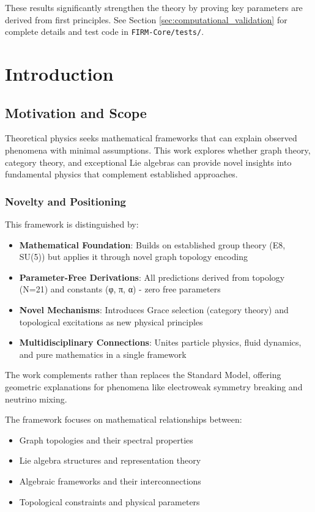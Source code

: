 \documentclass[12pt,a4paper]{article}
\begin{document}
These results significantly strengthen the theory by proving key parameters are derived from first principles. See Section \ref{sec:computational_validation} for complete details and test code in \texttt{FIRM-Core/tests/}.

\section{Introduction}

\subsection{Motivation and Scope}

Theoretical physics seeks mathematical frameworks that can explain observed phenomena with minimal assumptions. This work explores whether graph theory, category theory, and exceptional Lie algebras can provide novel insights into fundamental physics that complement established approaches.

\subsubsection{Novelty and Positioning}
This framework is distinguished by:
\begin{itemize}
\item \textbf{Mathematical Foundation}: Builds on established group theory (E8, SU(5)) but applies it through novel graph topology encoding
\item \textbf{Parameter-Free Derivations}: All predictions derived from topology (N=21) and constants (φ, π, α) - zero free parameters
\item \textbf{Novel Mechanisms}: Introduces Grace selection (category theory) and topological excitations as new physical principles
\item \textbf{Multidisciplinary Connections}: Unites particle physics, fluid dynamics, and pure mathematics in a single framework
\end{itemize}

The work complements rather than replaces the Standard Model, offering geometric explanations for phenomena like electroweak symmetry breaking and neutrino mixing.

The framework focuses on mathematical relationships between:
\begin{itemize}
\item Graph topologies and their spectral properties
\item Lie algebra structures and representation theory
\item Algebraic frameworks and their interconnections
\item Topological constraints and physical parameters
\end{itemize}
\end{document}
